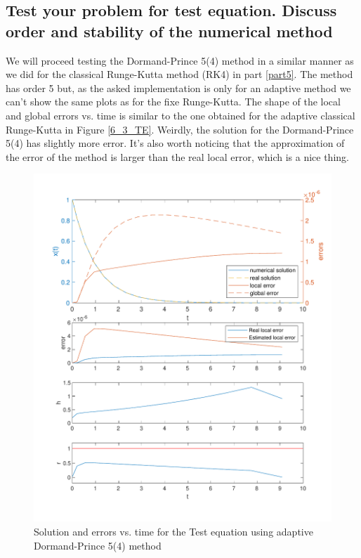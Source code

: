 \subsection{Test your problem for test equation. Discuss order and stability of the numerical method}
We will proceed testing the Dormand-Prince 5(4) method in a similar manner as we did for the classical Runge-Kutta method (RK4) in part \ref{part5}. The method has order 5 but, as the asked implementation is only for an adaptive method we can't show the same plots as for the fixe Runge-Kutta.
The shape of the local and global errors vs. time is similar to the one obtained for the adaptive classical Runge-Kutta in Figure \ref{6_3_TE}. Weirdly, the solution for the Dormand-Prince 5(4) has slightly more error. It's also worth noticing that the approximation of the error of the method is larger than the real local error, which is a nice thing. 

\begin{figure}[H]
    \centering
    \includegraphics[width=0.7\linewidth]{images/7/7_3_TestEquation.pdf} 
    \caption{Solution and errors vs. time for the Test equation using adaptive Dormand-Prince 5(4) method}
    \label{7_3_TE}
\end{figure}

